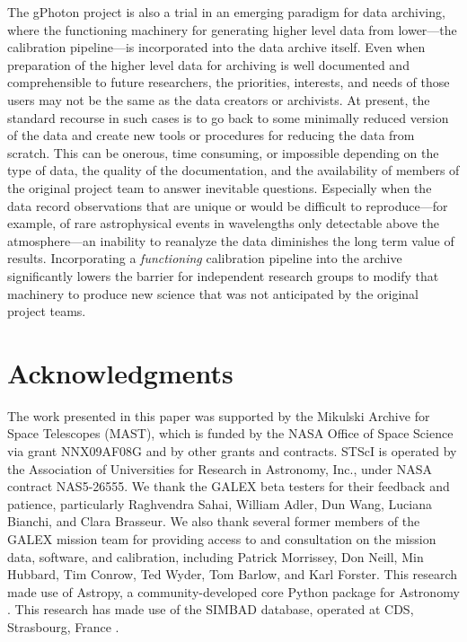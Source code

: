 \documentclass[trackchanges,preprint2]{aastex}
\begin{document}
The gPhoton project is also a trial in an emerging paradigm for data archiving, where the functioning machinery for generating higher level data from lower---the calibration pipeline---is incorporated into the data archive itself. Even when preparation of the higher level data for archiving is well documented and comprehensible to future researchers, the priorities, interests, and needs of those users may not be the same as the data creators or archivists. At present, the standard recourse in such cases is to go back to some minimally reduced version of the data and create new tools or procedures for reducing the data from scratch. This can be onerous, time consuming, or impossible depending on the type of data, the quality of the documentation, and the availability of members of the original project team to answer inevitable questions. Especially when the data record observations that are unique or would be difficult to reproduce---for example, of rare astrophysical events in wavelengths only detectable above the atmosphere---an inability to reanalyze the data diminishes the long term value of results. Incorporating a \emph{functioning} calibration pipeline into the archive significantly lowers the barrier for independent research groups to modify that machinery to produce new science that was not anticipated by the original project teams.

\section{Acknowledgments}
The work presented in this paper was supported by the Mikulski Archive for Space Telescopes (MAST), which is funded by the NASA Office of Space Science via grant NNX09AF08G and by other grants and contracts. STScI is operated by the Association of Universities for Research in Astronomy, Inc., under NASA contract NAS5-26555.  We thank the GALEX beta testers for their feedback and patience, particularly Raghvendra Sahai, William Adler, Dun Wang, Luciana Bianchi, and Clara Brasseur.  We also thank several former members of the GALEX mission team for providing access to and consultation on the mission data, software, and calibration, including Patrick Morrissey, Don Neill, Min Hubbard, Tim Conrow, Ted Wyder, Tom Barlow, and Karl Forster.  This research made use of Astropy, a community-developed core Python package for Astronomy \citep{astropy}. This research has made use of the SIMBAD database, operated at CDS, Strasbourg, France \citep{simbad}.


\end{document}
